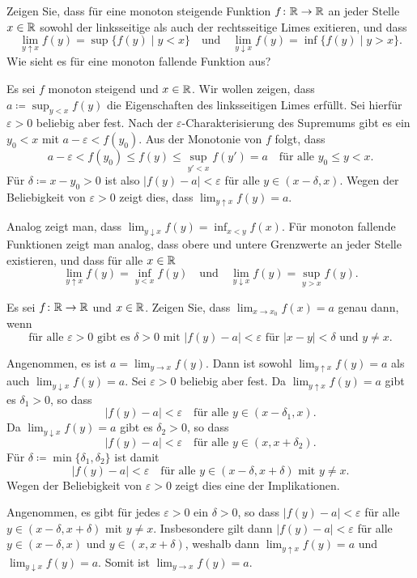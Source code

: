 \documentclass[a4paper,10pt]{article}
\begin{document}
\begin{question}
 Zeigen Sie, dass für eine monoton steigende Funktion $f \colon \mathbb{R} \to \mathbb{R}$ an jeder Stelle $x \in \mathbb{R}$ sowohl der linksseitige als auch der rechtsseitige Limes exitieren, und dass
 \[
  \lim_{y \uparrow x} f(y) = \sup\{f(y) \mid y < x\}
  \quad
  \text{und}
  \quad
  \lim_{y \downarrow x} f(y) = \inf\{f(y) \mid y > x\}.
 \]
 Wie sieht es für eine monoton fallende Funktion aus?
\end{question}
\begin{solution}
 Es sei $f$ monoton steigend und $x \in \mathbb{R}$. Wir wollen zeigen, dass $a \coloneqq \sup_{y < x} f(y)$ die Eigenschaften des linksseitigen Limes erfüllt. Sei hierfür $\varepsilon > 0$ beliebig aber fest. Nach der $\varepsilon$-Charakterisierung des Supremums gibt es ein $y_0 < x$ mit $a-\varepsilon < f(y_0)$. Aus der Monotonie von $f$ folgt, dass
 \[
  a-\varepsilon < f(y_0) \leq f(y) \leq \sup_{y' < x} f(y') = a \quad \text{für alle $y_0 \leq y < x$}.
 \]
 Für $\delta \coloneqq x-y_0 > 0$ ist also $|f(y)-a| < \varepsilon$ für alle $y \in (x-\delta, x)$. Wegen der Beliebigkeit von $\varepsilon>0$ zeigt dies, dass $\lim_{y \uparrow x} f(y) = a$.
 
 Analog zeigt man, dass $\lim_{y \downarrow x} f(y) = \inf_{x < y} f(x)$. Für monoton fallende Funktionen zeigt man analog, dass obere und untere Grenzwerte an jeder Stelle existieren, und dass für alle $x \in \mathbb{R}$
 \[
  \lim_{y \uparrow x} f(y) = \inf_{y < x} f(y)
  \quad
  \text{und}
  \quad
  \lim_{y \downarrow x} f(y) = \sup_{y > x} f(y).
 \]
\end{solution}


\begin{question}\label{qst: Charakterisierung beidseitiger Grenzwert}
 Es sei $f \colon \mathbb{R} \to \mathbb{R}$ und $x \in \mathbb{R}$. Zeigen Sie, dass $\lim_{x \to x_0} f(x) = a$ genau dann, wenn
 \[
  \text{für alle $\varepsilon > 0$ gibt es $\delta > 0$ mit $|f(y)-a| < \varepsilon$ für $|x-y| < \delta$ und $y \neq x$}.
 \]
\end{question}
\begin{solution}
 Angenommen, es ist $a = \lim_{y \to x} f(y)$. Dann ist sowohl $\lim_{y \uparrow x} f(y) = a$ als auch $\lim_{y \downarrow x} f(y) = a$. Sei $\varepsilon > 0$ beliebig aber fest. Da $\lim_{y \uparrow x} f(y) = a$ gibt es $\delta_1 > 0$, so dass
 \[
  |f(y)-a| < \varepsilon \quad \text{für alle $y \in (x-\delta_1, x)$}.
 \]
 Da $\lim_{y \downarrow x} f(y) = a$ gibt es $\delta_2 > 0$, so dass
 \[
  |f(y)-a| < \varepsilon \quad \text{für alle $y \in (x, x+\delta_2)$}.
 \]
 Für $\delta \coloneqq \min\{\delta_1, \delta_2\}$ ist damit
 \[
  |f(y)-a| < \varepsilon \quad \text{für alle $y \in (x-\delta, x+\delta)$ mit $y \neq x$}.
 \]
 Wegen der Beliebigkeit von $\varepsilon > 0$ zeigt dies eine der Implikationen.
 
 Angenommen, es gibt für jedes $\varepsilon > 0$ ein $\delta > 0$, so dass $|f(y)-a| < \varepsilon$ für alle $y \in (x-\delta, x+\delta)$ mit $y \neq x$. Insbesondere gilt dann $|f(y)-a| < \varepsilon$ für alle $y \in (x-\delta,x)$ und $y \in (x,x+\delta)$, weshalb dann $\lim_{y \uparrow x} f(y) = a$ und $\lim_{y \downarrow x} f(y) = a$. Somit ist $\lim_{y \to x} f(y) = a$.
\end{solution}
\end{document}
